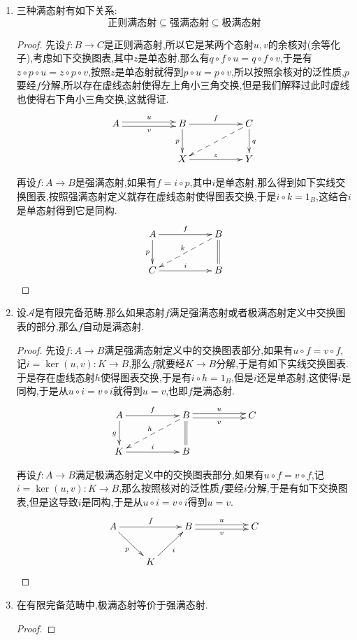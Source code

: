 \begin{enumerate}
\begin{itemize}
\begin{proof}
        	设$f$同时是单态射和强满态射,那么按照强满态射定义就有虚线态射$g$使得如下图表交换,也即$g\circ f=1_A$和$f\circ g=1_B$,这说明$f$是同构.
        	$$\xymatrix{A\ar[rr]^f\ar@{=}[d]&&B\ar@{=}[d]\ar@{-->}[dll]_g\\A\ar[rr]_f&&B}$$
        \end{proof}
    \end{itemize}
    \item 三种满态射有如下关系:
    $$\textbf{正则满态射}\subseteq\textbf{强满态射}\subseteq\textbf{极满态射}$$
    \begin{proof}
    	
    	先设$f:B\to C$是正则满态射,所以它是某两个态射$u,v$的余核对(余等化子),考虑如下交换图表,其中$z$是单态射.那么有$q\circ f\circ u=q\circ f\circ v$,于是有$z\circ p\circ u=z\circ p\circ v$,按照$z$是单态射就得到$p\circ u=p\circ v$,所以按照余核对的泛性质,$p$要经$f$分解,所以存在虚线态射使得左上角小三角交换,但是我们解释过此时虚线也使得右下角小三角交换,这就得证.
    	$$\xymatrix{A\ar@<0.5ex>[rr]^u\ar@<-0.5ex>[rr]_v&&B\ar[rr]^f\ar[d]_p&&C\ar[d]^q\ar@{-->}[dll]\\&&X\ar[rr]^z&&Y}$$
    	
    	再设$f:A\to B$是强满态射,如果有$f=i\circ p$,其中$i$是单态射,那么得到如下实线交换图表,按照强满态射定义就存在虚线态射使得图表交换,于是$i\circ k=1_B$,这结合$i$是单态射得到它是同构.
    	$$\xymatrix{A\ar[rr]^f\ar[d]_p&&B\ar@{=}[d]\ar@{-->}[dll]_k\\C\ar[rr]^i&&B}$$
    \end{proof}
    \item 设$\mathscr{A}$是有限完备范畴.那么如果态射$f$满足强满态射或者极满态射定义中交换图表的部分,那么$f$自动是满态射.
    \begin{proof}
    	
    	先设$f:A\to B$满足强满态射定义中的交换图表部分,如果有$u\circ f=v\circ f$,记$i=\ker(u,v):K\to B$,那么$f$就要经$K\to B$分解,于是有如下实线交换图表.于是存在虚线态射$h$使得图表交换,于是有$i\circ h=1_B$,但是$i$还是单态射,这使得$i$是同构,于是从$u\circ i=v\circ i$就得到$u=v$,也即$f$是满态射.
    	$$\xymatrix{A\ar[rr]^f\ar[d]_g&&B\ar@<0.5ex>[rr]^u\ar@<-0.5ex>[rr]_v\ar@{=}[d]\ar@{-->}[dll]_h&&C\\K\ar[rr]^i&&B&&}$$
    	
    	再设$f:A\to B$满足极满态射定义中的交换图表部分,如果有$u\circ f=v\circ f$,记$i=\ker(u,v):K\to B$,那么按照核对的泛性质$f$要经$i$分解,于是有如下交换图表,但是这导致$i$是同构,于是从$u\circ i=v\circ i$得到$u=v$.
    	$$\xymatrix{A\ar[rr]^f\ar[dr]_p&&B\ar@<0.5ex>[rr]^u\ar@<-0.5ex>[rr]_v&&C\\&K\ar[ur]_i&&&}$$
    \end{proof}
    \item 在有限完备范畴中,极满态射等价于强满态射.
    \begin{proof}
    	

\end{proof}
\end{enumerate}

